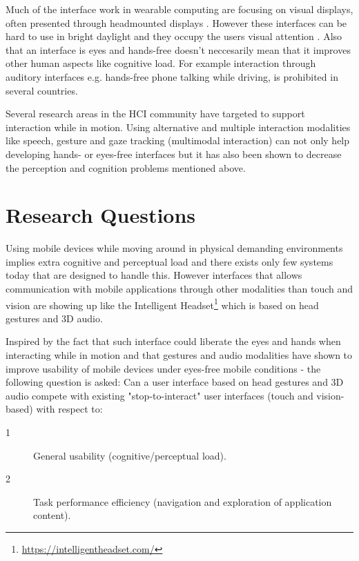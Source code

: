 Much of the interface work in wearable computing are focusing on visual displays, often presented through headmounted displays \cite{barfield_fundamentals_2000}. However these interfaces can be hard to use in bright daylight and they occupy the users visual attention \cite{geelhoed_safety_2000}. Also that an interface is eyes and hands-free doesn't neccesarily mean that it improves other human aspects like cognitive load. For example interaction through auditory interfaces e.g. hands-free phone talking while driving, is prohibited in several countries.

Several research areas in the HCI community have targeted to support interaction while in motion. Using alternative and multiple interaction modalities like speech, gesture and gaze tracking (multimodal interaction) can not only help developing hands- or eyes-free interfaces but it has also been shown to decrease the perception and cognition problems mentioned above.

\newpage

\section{Research Questions}
\label{sec:researchquestions}
Using mobile devices while moving around in physical demanding environments implies extra cognitive and perceptual load and there exists only few systems today that are designed to handle this. However interfaces that allows communication with mobile applications through other modalities than touch and vision are showing up like the Intelligent Headset\footnote{\url{https://intelligentheadset.com/}} which is based on head gestures and 3D audio.

Inspired by the fact that such interface could liberate the eyes and hands when interacting while in motion and that gestures and audio modalities have shown to improve usability of mobile devices under eyes-free mobile conditions \cite{brewster_multimodal_2003} - the following question is asked: Can a user interface based on head gestures and 3D audio compete with existing "stop-to-interact" user interfaces (touch and vision-based) with respect to:

\begin{description}
\item[1] General usability (cognitive/perceptual load).
\item[2] Task performance efficiency (navigation and exploration of application content).
\end{description}


